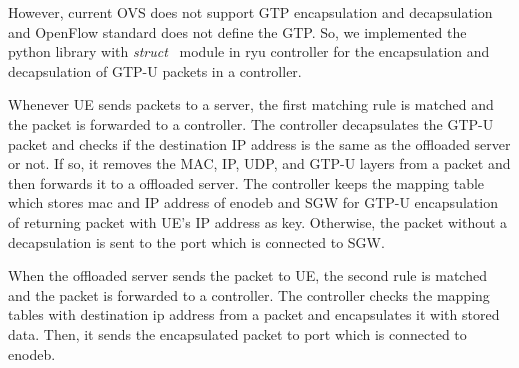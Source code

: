 However, current OVS does not support GTP encapsulation and decapsulation  and OpenFlow standard does not define the GTP. So, we implemented the python library with \textit{struct}~\cite{py_struct}  module in ryu controller for the encapsulation and decapsulation of GTP-U packets in a controller. 

Whenever UE sends packets to a server, the first matching rule is matched and the packet is forwarded to a controller. The controller decapsulates the GTP-U packet and checks if the destination IP address is the same as the offloaded server or not. If so, it removes the MAC, IP, UDP, and GTP-U layers from a packet and then forwards it to a offloaded server. The controller keeps the mapping table which stores mac and IP address of enodeb and SGW for GTP-U encapsulation of returning packet with UE’s IP address as key. Otherwise, the packet without a decapsulation is sent to the port which is connected to SGW. 

When the offloaded server sends the packet to UE, the second rule is matched and the packet is forwarded to a controller. The controller checks the mapping tables with destination ip address from a packet and encapsulates it with stored data. Then, it sends the encapsulated packet to port which is connected to enodeb.
